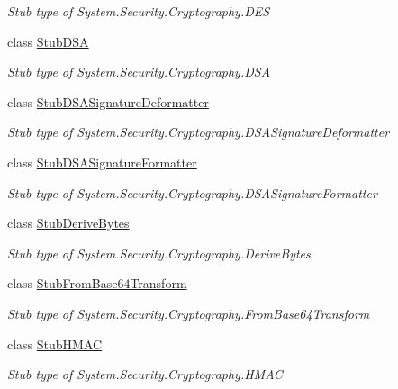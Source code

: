 \begin{DoxyCompactItemize}
\begin{DoxyCompactList}\small\item\em Stub type of System.\-Security.\-Cryptography.\-D\-E\-S\end{DoxyCompactList}\item 
class \hyperlink{class_system_1_1_security_1_1_cryptography_1_1_fakes_1_1_stub_d_s_a}{Stub\-D\-S\-A}
\begin{DoxyCompactList}\small\item\em Stub type of System.\-Security.\-Cryptography.\-D\-S\-A\end{DoxyCompactList}\item 
class \hyperlink{class_system_1_1_security_1_1_cryptography_1_1_fakes_1_1_stub_d_s_a_signature_deformatter}{Stub\-D\-S\-A\-Signature\-Deformatter}
\begin{DoxyCompactList}\small\item\em Stub type of System.\-Security.\-Cryptography.\-D\-S\-A\-Signature\-Deformatter\end{DoxyCompactList}\item 
class \hyperlink{class_system_1_1_security_1_1_cryptography_1_1_fakes_1_1_stub_d_s_a_signature_formatter}{Stub\-D\-S\-A\-Signature\-Formatter}
\begin{DoxyCompactList}\small\item\em Stub type of System.\-Security.\-Cryptography.\-D\-S\-A\-Signature\-Formatter\end{DoxyCompactList}\item 
class \hyperlink{class_system_1_1_security_1_1_cryptography_1_1_fakes_1_1_stub_derive_bytes}{Stub\-Derive\-Bytes}
\begin{DoxyCompactList}\small\item\em Stub type of System.\-Security.\-Cryptography.\-Derive\-Bytes\end{DoxyCompactList}\item 
class \hyperlink{class_system_1_1_security_1_1_cryptography_1_1_fakes_1_1_stub_from_base64_transform}{Stub\-From\-Base64\-Transform}
\begin{DoxyCompactList}\small\item\em Stub type of System.\-Security.\-Cryptography.\-From\-Base64\-Transform\end{DoxyCompactList}\item 
class \hyperlink{class_system_1_1_security_1_1_cryptography_1_1_fakes_1_1_stub_h_m_a_c}{Stub\-H\-M\-A\-C}
\begin{DoxyCompactList}\small\item\em Stub type of System.\-Security.\-Cryptography.\-H\-M\-A\-C\end{DoxyCompactList}\item 

\end{DoxyCompactItemize}
